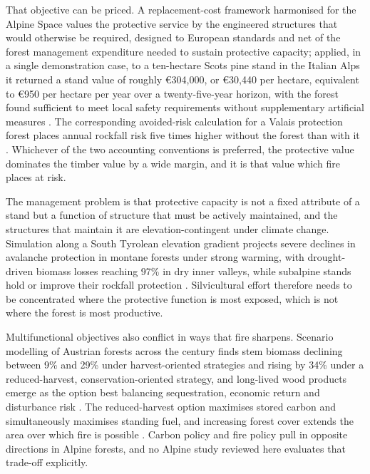 \documentclass[11pt,a4paper]{article}
\begin{document}
That objective can be priced. A replacement-cost framework harmonised for the Alpine Space values the protective service by the engineered structures that would otherwise be required, designed to European standards and net of the forest management expenditure needed to sustain protective capacity; applied, in a single demonstration case, to a ten-hectare Scots pine stand in the Italian Alps it returned a stand value of roughly €304{,}000, or €30{,}440 per hectare, equivalent to €950 per hectare per year over a twenty-five-year horizon, with the forest found sufficient to meet local safety requirements without supplementary artificial measures \citep{accastello_asforesee_2019}. The corresponding avoided-risk calculation for a Valais protection forest places annual rockfall risk five times higher without the forest than with it \citep{moos_climate_2021}. Whichever of the two accounting conventions is preferred, the protective value dominates the timber value by a wide margin, and it is that value which fire places at risk.

The management problem is that protective capacity is not a fixed attribute of a stand but a function of structure that must be actively maintained, and the structures that maintain it are elevation-contingent under climate change. Simulation along a South Tyrolean elevation gradient projects severe declines in avalanche protection in montane forests under strong warming, with drought-driven biomass losses reaching 97\% in dry inner valleys, while subalpine stands hold or improve their rockfall protection \citep{hillebrand_contrasting_2023}. Silvicultural effort therefore needs to be concentrated where the protective function is most exposed, which is not where the forest is most productive.

Multifunctional objectives also conflict in ways that fire sharpens. Scenario modelling of Austrian forests across the century finds stem biomass declining between 9\% and 29\% under harvest-oriented strategies and rising by 34\% under a reduced-harvest, conservation-oriented strategy, and long-lived wood products emerge as the option best balancing sequestration, economic return and disturbance risk \citep{jandl_strategies_2018}. The reduced-harvest option maximises stored carbon and simultaneously maximises standing fuel, and increasing forest cover extends the area over which fire is possible \citep{gerberding_mapping_2025}. Carbon policy and fire policy pull in opposite directions in Alpine forests, and no Alpine study reviewed here evaluates that trade-off explicitly.
\end{document}

